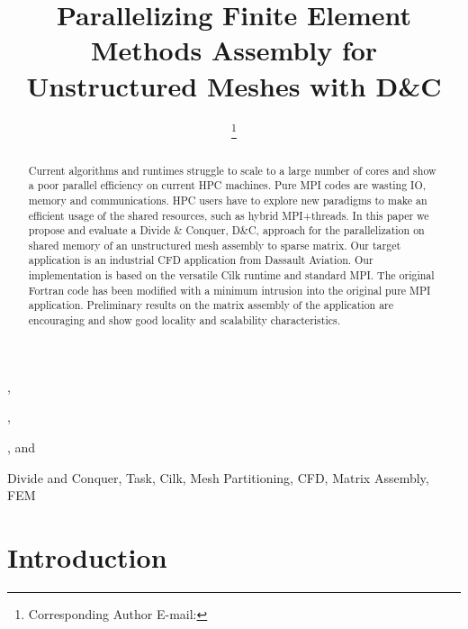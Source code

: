 \documentclass{IOS-Book-Article}
\begin{document}
\begin{frontmatter}              %

\title{Parallelizing Finite Element Methods Assembly for Unstructured Meshes with D\&C}

\author[A]{ %
\thanks{Corresponding Author E-mail: }},
\author[A]{ },
\author[A]{ },
and
\author[B]{ }

\address[A]{PRISM - University of Versailles, France}
\address[B]{Dassault Aviation, Saint-Cloud, France}

\begin{abstract}
Current algorithms and runtimes struggle to scale to a large number of cores and show a poor parallel efficiency on current HPC machines.
Pure MPI codes are wasting IO, memory and communications. HPC users have to explore new paradigms to make an efficient usage of the shared resources,
such as hybrid MPI+threads.
In this paper we propose and evaluate a Divide \& Conquer, D\&C, approach for the parallelization on shared memory of an unstructured mesh assembly to sparse matrix.
Our target application is an industrial CFD application from Dassault Aviation.
Our implementation is based on the versatile Cilk runtime and standard MPI.
The original Fortran code has been modified with a minimum intrusion into the original pure MPI application.
Preliminary results on the matrix assembly of the application are encouraging and show good locality and scalability characteristics.
\end{abstract}

\begin{keyword}
Divide and Conquer, Task, Cilk, Mesh Partitioning, CFD, Matrix Assembly, FEM
\end{keyword}
\end{frontmatter}

\thispagestyle{empty}
\pagestyle{empty}

\section{Introduction}
\end{document}
